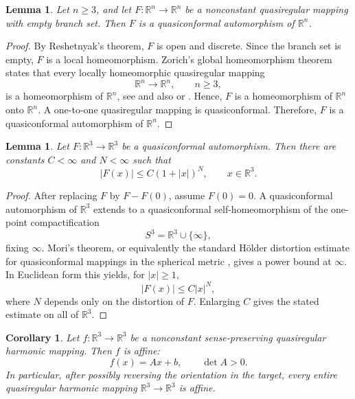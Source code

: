 \documentclass[10pt]{amsart}
\numberwithin{equation}{section}
\newtheorem{lemma}[theorem]{Lemma}
\newtheorem{corollary}[theorem]{Corollary}
\theoremstyle{definition}
\newcommand{\R}{\mathbb R}
\begin{document}
\begin{lemma}
\label{lem-zorich}
Let \(n\ge3\), and let \(F:\R^n\to\R^n\) be a nonconstant quasiregular
mapping with empty branch set. Then \(F\) is a quasiconformal automorphism of
\(\R^n\).
\end{lemma}

\begin{proof}
By Reshetnyak's theorem, \(F\) is open and discrete. Since the branch set is
empty, \(F\) is a local homeomorphism. Zorich's global homeomorphism theorem
states that every locally homeomorphic quasiregular mapping
\[
        \R^n\to\R^n,\qquad n\ge3,
\]
is a homeomorphism of \(\R^n\), see \cite{Zorich1967} and also
\cite[Section II.6]{Rickman} or \cite[Section 17]{Vaisala}. Hence, \(F\) is a
homeomorphism of \(\R^n\) onto \(\R^n\). A one-to-one quasiregular mapping is
quasiconformal. Therefore, \(F\) is a quasiconformal automorphism of \(\R^n\).
\end{proof}

\begin{lemma}
\label{lem-polynomial-growth}
Let \(F:\R^3\to\R^3\) be a quasiconformal automorphism. Then there are
constants \(C<\infty\) and \(N<\infty\) such that
\[
        |F(x)|\le C(1+|x|)^N,
        \qquad
        x\in\R^3.
\]
\end{lemma}

\begin{proof}
After replacing \(F\) by \(F-F(0)\), assume \(F(0)=0\). A quasiconformal
automorphism of \(\R^3\) extends to a quasiconformal self-homeomorphism of
the one-point compactification
\[
        S^3=\R^3\cup\{\infty\},
\]
fixing \(\infty\). Mori's theorem, or equivalently the standard H\"older
distortion estimate for quasiconformal mappings in the spherical metric
\cite{Vaisala}, gives a power bound at \(\infty\). In Euclidean form this
yields, for \(|x|\ge1\),
\[
        |F(x)|\le C|x|^N,
\]
where \(N\) depends only on the distortion of \(F\). Enlarging \(C\) gives
the stated estimate on all of \(\R^3\).
\end{proof}

\begin{corollary}
\label{cor-entire-liouville}
Let \(f:\R^3\to\R^3\) be a nonconstant sense-preserving quasiregular harmonic
mapping. Then \(f\) is affine:
\[
        f(x)=Ax+b,
        \qquad
        \det A>0.
\]
In particular, after possibly reversing the orientation in the target, every
entire quasiregular harmonic mapping \(\R^3\to\R^3\) is affine.
\end{corollary}
\end{document}
